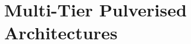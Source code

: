 
\chapter{Multi-Tier Pulverised Architectures}
%
\newcommand{\scalaloci}{{ScalaLoci}}
\newcommand{\scafiloci}{{ScaFiLoci}}
\newcommand{\scalainline}[1]{\texttt{#1}}

